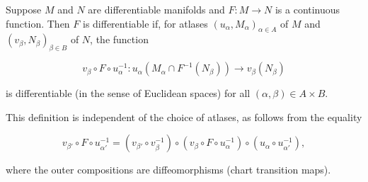 Suppose $M$ and $N$ are differentiable manifolds and $F: M \to N$ is a continuous function. Then $F$ is differentiable if, for atlases $(u_\alpha, M_\alpha)_{\alpha \in A}$ of $M$ and $(v_\beta, N_\beta)_{\beta \in B}$ of $N$, the function

$$v_\beta \circ F \circ u_{\alpha}^{-1}: u_\alpha(M_\alpha \cap F^{-1}(N_\beta)) \to v_\beta(N_\beta)$$

is differentiable (in the sense of Euclidean spaces) for all $(\alpha, \beta) \in A \times B$.

This definition is independent of the choice of atlases, as follows from the equality

$$v_{\beta'} \circ F \circ u_{\alpha'}^{-1} = (v_{\beta'} \circ v_{\beta}^{-1}) \circ (v_\beta \circ F \circ u_{\alpha}^{-1}) \circ (u_\alpha \circ u_{\alpha'}^{-1}),$$

where the outer compositions are diffeomorphisms (chart transition maps).
